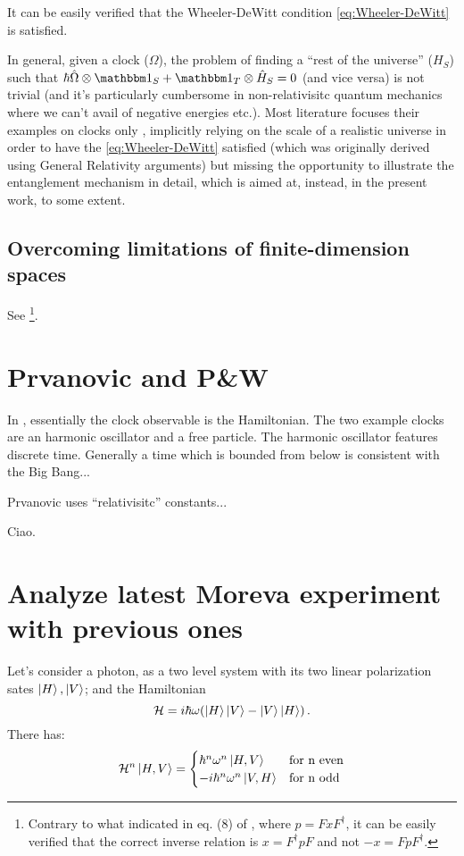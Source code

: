 It can be easily verified that the Wheeler-DeWitt condition
\eqref{eq:Wheeler-DeWitt} is satisfied.

In general, given a clock ($\Omega$), the problem of finding a
``rest of the universe'' ($H_S$) such that
$\hbar\hat{\Omega}\ox\idop_S + \idop_T\ox\hat{H}_S = 0$
(and vice versa)
is not trivial
(and it's particularly cumbersome in non-relativisitc
quantum mechanics where we can't avail of negative energies etc.).
Most literature focuses their examples on clocks only \parencite{Prvanovic,RealisticClocks,HarmonicClocks},
implicitly relying on the scale of a realistic universe
in order to have the \eqref{eq:Wheeler-DeWitt} satisfied
(which was originally derived using General Relativity arguments)
but missing the opportunity to illustrate the entanglement mechanism in detail,
which is aimed at, instead, in the present work, to some extent.

\subsection{Overcoming limitations of finite-dimension spaces}
See \cite{FiniteHilb}\footnote{
  Contrary to what indicated in eq. (8) of \cite{FiniteHilb},
  where $ p = F x F^{\dagger} $,
  it can be easily verified that the correct inverse relation is
  $ x = F^{\dagger} p F$ and not $ -x = F p F^{\dagger} $.
}.

\iftodo

\section{Prvanovic and P\&W}
In \cite{Prvanovic}, essentially the clock observable is the Hamiltonian.
The two example clocks are an harmonic oscillator and a free particle.
The harmonic oscillator features discrete time. Generally a time which is
{bounded from below}
is consistent with the Big Bang...

Prvanovic uses ``relativisitc'' constants...

Ciao.

\section{Analyze latest Moreva experiment with previous ones}

Let's consider a photon, as a two level system with its two linear polarization
sates $\ket{H}, \ket{V}$;
and the Hamiltonian
\begin{equation}
  \mathcal{H}=i\hbar\omega\qty(\ket{H}\ket{V}-\ket{V}\ket{H})\,\text{.}
\end{equation}
There has:
\[
  \mathcal{H}^n \ket{H, V} = \begin{cases}
      \hbar^n\omega^n\ket{H, V} &\text{for n even} \\
    -i\hbar^n\omega^n\ket{V, H} &\text{for n odd}
  \end{cases}
\]

